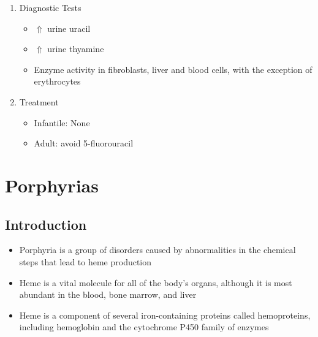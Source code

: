 \documentclass{scrartcl}
\begin{document}
\begin{enumerate}
\item Diagnostic Tests
\label{sec:org3f1be64}
\begin{itemize}
\item \(\Uparrow\) urine uracil
\item \(\Uparrow\) urine thyamine
\item Enzyme activity in fibroblasts, liver and blood cells, with the
exception of erythrocytes
\end{itemize}

\item Treatment
\label{sec:orgcb5fa83}
\begin{itemize}
\item Infantile: None
\item Adult: avoid 5-fluorouracil
\end{itemize}
\end{enumerate}

\section{Porphyrias}
\label{sec:orgd174a04}
\subsection{Introduction}
\label{sec:org24bac13}
\begin{itemize}
\item Porphyria is a group of disorders caused by abnormalities in the
chemical steps that lead to heme production
\item Heme is a vital molecule for all of the body's organs, although it is
most abundant in the blood, bone marrow, and liver
\item Heme is a component of several iron-containing proteins called
hemoproteins, including hemoglobin and the cytochrome P450 family of
enzymes
\end{itemize}

\end{document}
